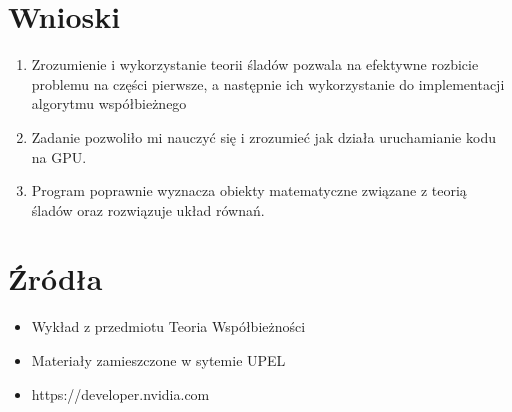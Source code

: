 \documentclass{article}
\begin{document}
\section{Wnioski}

\begin{enumerate}
    \item Zrozumienie i wykorzystanie teorii śladów pozwala na efektywne rozbicie problemu na części pierwsze, a następnie ich wykorzystanie do implementacji algorytmu współbieżnego
    \item Zadanie pozwoliło mi nauczyć się i zrozumieć jak działa uruchamianie kodu na GPU.
    \item Program poprawnie wyznacza obiekty matematyczne związane z teorią śladów oraz rozwiązuje układ równań.
\end{enumerate}

\section{Źródła}
\begin{itemize}
    \item Wykład z przedmiotu Teoria Współbieżności
    \item Materiały zamieszczone w sytemie UPEL
    \item https://developer.nvidia.com
\end{itemize}
\end{document}
